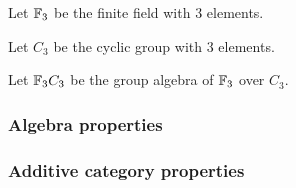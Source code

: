 \begin{notation}
    Let \( {\mathbb{F}}_3 \) be the finite field with \( 3 \) elements.
\end{notation}

\begin{notation}
    Let \( C_3 \) be the cyclic group with \( 3 \) elements.
\end{notation}

\begin{notation}
    Let \( {\mathbb{F}}_3 C_3 \) be the group algebra of \( {\mathbb{F}}_3 \) over \( C_3 \).
\end{notation}

\subsubsection{Algebra properties}



\subsubsection{Additive category properties}


